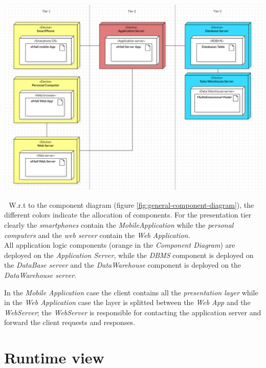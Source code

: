\documentclass[a4paper]{report}
\begin{document}
\begin{minipage}{\linewidth}
        \centering
        \includegraphics[scale=0.5]{img/DEPLOYMENT DIAGRAM.png}
        \label{fig:deployment-diagram}
\end{minipage}
    


$ $\newline
$ $\newline
W.r.t to the component diagram (figure \ref{fig:general-component-diagram}), the different colors indicate the allocation of components.
For the presentation tier clearly the \textit{smartphones} contain the \textit{MobileApplication} while the \textit{personal computers} and the \textit{web server} contain the \textit{Web Application}.\\
All application logic components (orange in the \textit{Component Diagram}) are deployed on the \textit{Application Server}, while the \textit{DBMS} component is deployed on the \textit{DataBase server} and the \textit{DataWarehouse} component is deployed on the \textit{DataWarehouse server}.

In the \textit{Mobile Application} case the client contains all the \textit{presentation layer} while in the \textit{Web Application} case the layer is splitted between the \textit{Web App} and the \textit{WebServer}; the \textit{WebServer} is responsible for contacting the application server and forward the client requests and responses.\\

\section{Runtime view}
\end{document}
